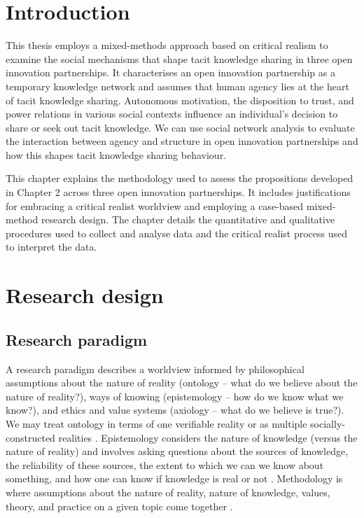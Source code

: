 \section{Introduction}

This thesis employs a mixed-methods approach based on critical realism to examine the social mechanisms that shape tacit knowledge sharing in three open innovation partnerships. It characterises an open innovation partnership as a temporary knowledge network and assumes that human agency lies at the heart of tacit knowledge sharing. Autonomous motivation, the disposition to trust, and power relations in various social contexts influence an individual's decision to share or seek out tacit knowledge. We can use social network analysis to evaluate the interaction between agency and structure in open innovation partnerships and how this shapes tacit knowledge sharing behaviour. \medskip

This chapter explains the methodology used to assess the propositions developed in Chapter 2 across three open innovation partnerships. It includes justifications for embracing a critical realist worldview and employing a case-based mixed-method research design. The chapter details the quantitative and qualitative procedures used to collect and analyse data and the critical realist process used to interpret the data. 

\section{Research design}

\subsection{Research paradigm}

A research paradigm describes a worldview informed by philosophical assumptions about the nature of reality (ontology -- what do we believe about the nature of reality?), ways of knowing (epistemology -- how do we know what we know?), and ethics and value systems (axiology -- what do we believe is true?). We may treat ontology in terms of one verifiable reality or as multiple socially-constructed realities \citep{chilisa2012selecting}. Epistemology considers the nature of knowledge (versus the nature of reality) and involves asking questions about the sources of knowledge, the reliability of these sources, the extent to which we can we know about something, and how one can know if knowledge is real or not \citep{patton2002qualitative}. Methodology is where assumptions about the nature of reality, nature of knowledge, values, theory, and practice on a given topic come together \citep{chilisa2012selecting}.

